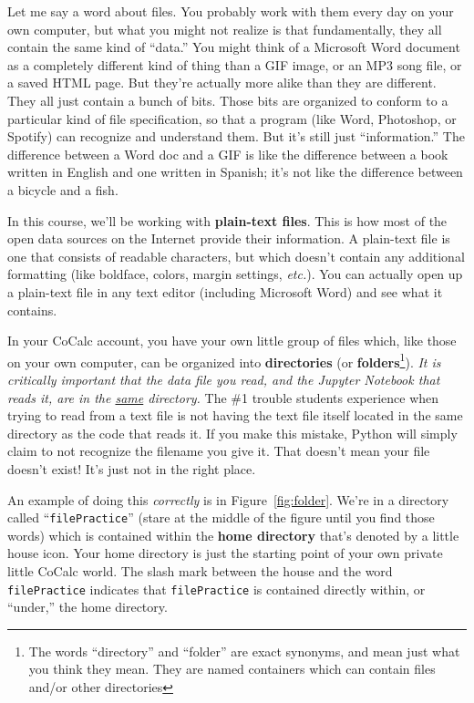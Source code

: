 Let me say a word about files. You probably work with them every day on your
own computer, but what you might not realize is that fundamentally, they all
contain the same kind of ``data.'' You might think of a Microsoft Word document
as a completely different kind of thing than a GIF image, or an MP3 song file,
or a saved HTML page. But they're actually more alike than they are different.
They all just contain a bunch of bits. Those bits are organized to conform to a
particular kind of file specification, so that a program (like Word, Photoshop,
or Spotify) can recognize and understand them. But it's still just
``information.'' The difference between a Word doc and a GIF is like the
difference between a book written in English and one written in Spanish; it's
not like the difference between a bicycle and a fish.

In this course, we'll be working with \textbf{plain-text files}. This is how
most of the open data sources on the Internet provide their information. A
plain-text file is one that consists of readable characters, but which doesn't
contain any additional formatting (like boldface, colors, margin settings,
\textit{etc.}). You can actually open up a plain-text file in any text editor
(including Microsoft Word) and see what it contains.


In your CoCalc account, you have your own little group of files which, like
those on your own computer, can be organized into \textbf{directories} (or
\textbf{folders}\footnote{The words ``directory'' and ``folder'' are exact
synonyms, and mean just what you think they mean. They are named containers
which can contain files and/or other directories}). \textit{It is
critically important that the data file you read, and the Jupyter Notebook that
reads it, are in the \underline{same} directory.} The \#1 trouble students
experience when trying to read from a text file is not having the text file
itself located in the same directory as the code that reads it. If you make
this mistake, Python will simply claim to not recognize the filename you give
it. That doesn't mean your file doesn't exist! It's just not in the right
place.


An example of doing this \textit{correctly} is in Figure~\ref{fig:folder}.
We're in a directory called ``\texttt{filePractice}'' (stare at the middle of
the figure until you find those words) which is contained within the
\textbf{home directory} that's denoted by a little house icon. Your home
directory is just the starting point of your own private little CoCalc world.
The slash mark between the house and the word \texttt{filePractice} indicates
that \texttt{filePractice} is contained directly within, or ``under,'' the home
directory.


